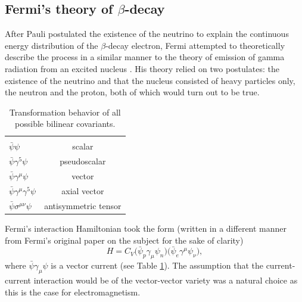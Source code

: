 \subsection{Fermi's theory of $\beta$-decay}
After Pauli postulated the existence of the neutrino to explain the continuous energy
distribution of the $\beta$-decay electron, Fermi attempted to theoretically describe
the process in a similar manner to the theory of emission of
gamma radiation from an excited nucleus \cite{fermi1934,wilson1968fermi}.
His theory relied on two postulates: the existence of the neutrino and that the nucleus consisted
of heavy particles only, the neutron and the proton, both of which would turn out to be true.

\begin{table}[h]
  \caption{Transformation behavior of all possible bilinear covariants.} 
  \centering
  \begin{tabular}{l c }
    \hline \hline \\ [-1.75ex]
    $\bar{\psi}\psi$ & scalar \\ [0.50ex]
    $\bar{\psi}\gamma^5\psi$ & pseudoscalar \\ [0.50ex]
    $\bar{\psi}\gamma^{\mu}\psi$ & vector \\ [0.50ex]
    $\bar{\psi}\gamma^{\mu}\gamma^5\psi$ & axial vector \\ [0.50ex]
    $\bar{\psi}\sigma^{\mu\nu}\psi$ & antisymmetric tensor \\ [0.50ex]   
    \hline
  \end{tabular}
  \label{tab:bilinearCov}
\end{table}

Fermi's interaction Hamiltonian took the form (written in a different manner from Fermi's original
paper on the subject for the sake of clarity) 
%
\begin{equation}
  H = C_V\big( \bar{\psi}_p \gamma_\mu \psi_n \big) \big( \bar{\psi}_e \gamma^\mu \psi_\nu \big), 
\end{equation}
%
where $\bar{\psi} \gamma_\mu \psi$ is a vector current (see Table \ref{tab:bilinearCov}). The assumption
that the current-current interaction would be of the vector-vector variety was a natural
choice as this is the case for electromagnetism.

